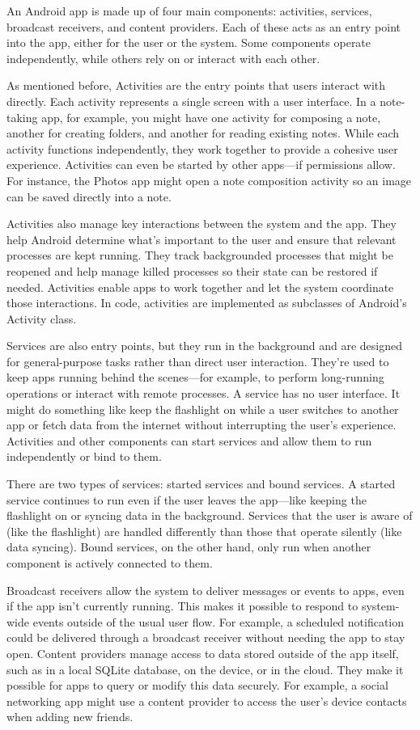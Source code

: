 An Android app is made up of four main components: activities, services, broadcast receivers, and content providers. Each of these acts as an entry point into the app, either for the user or the system. Some components operate independently, while others rely on or interact with each other.

As mentioned before, Activities are the entry points that users interact with directly. Each activity represents a single screen with a user interface. In a note-taking app, for example, you might have one activity for composing a note, another for creating folders, and another for reading existing notes. While each activity functions independently, they work together to provide a cohesive user experience. Activities can even be started by other apps—if permissions allow. For instance, the Photos app might open a note composition activity so an image can be saved directly into a note.

Activities also manage key interactions between the system and the app. They help Android determine what’s important to the user and ensure that relevant processes are kept running. They track backgrounded processes that might be reopened and help manage killed processes so their state can be restored if needed. Activities enable apps to work together and let the system coordinate those interactions. In code, activities are implemented as subclasses of Android’s Activity class.

Services are also entry points, but they run in the background and are designed for general-purpose tasks rather than direct user interaction. They’re used to keep apps running behind the scenes—for example, to perform long-running operations or interact with remote processes. A service has no user interface. It might do something like keep the flashlight on while a user switches to another app or fetch data from the internet without interrupting the user’s experience. Activities and other components can start services and allow them to run independently or bind to them.

There are two types of services: started services and bound services. A started service continues to run even if the user leaves the app—like keeping the flashlight on or syncing data in the background. Services that the user is aware of (like the flashlight) are handled differently than those that operate silently (like data syncing). Bound services, on the other hand, only run when another component is actively connected to them.

Broadcast receivers allow the system to deliver messages or events to apps, even if the app isn't currently running. This makes it possible to respond to system-wide events outside of the usual user flow. For example, a scheduled notification could be delivered through a broadcast receiver without needing the app to stay open.
Content providers manage access to data stored outside of the app itself, such as in a local SQLite database, on the device, or in the cloud. They make it possible for apps to query or modify this data securely. For example, a social networking app might use a content provider to access the user’s device contacts when adding new friends.

